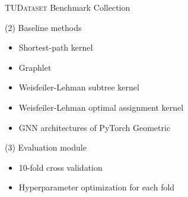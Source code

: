 \documentclass[utf8, xcolor=dvipsnames,ngerman]{beamer}
\begin{document}
\begin{frame}[t]{\textsc{TUDataset} Benchmark Collection}

\begin{block}{(2) Baseline methods}
 \begin{itemize}
  \item Shortest-path kernel 
  \item Graphlet  
  \item Weisfeiler-Lehman subtree kernel 
  \item Weisfeiler-Lehman optimal assignment kernel 
  \item GNN architectures of PyTorch Geometric 
 \end{itemize}
\end{block}

\pause

\begin{block}{(3) Evaluation module}
 \begin{itemize}
  \item 10-fold cross validation
  \item Hyperparameter optimization for each fold
 \end{itemize}
\end{block}
 
\end{frame}
\end{document}
